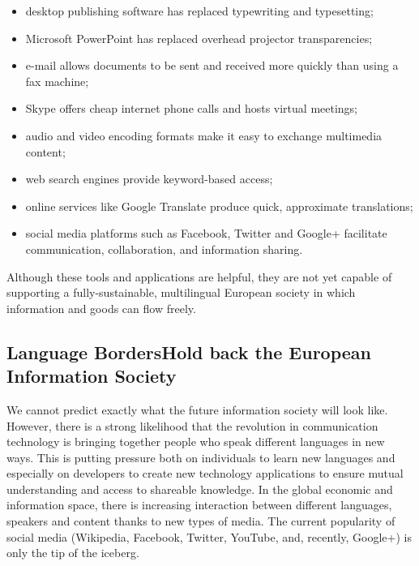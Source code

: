 \begin{multicols}{2}
\begin{itemize}
\item desktop publishing software has replaced typewriting and typesetting;
\item Microsoft PowerPoint has replaced overhead projector transparencies;
\item e-mail allows documents to be sent and received more quickly than using a fax machine;
\item Skype offers cheap internet phone calls and hosts virtual meetings;
\item audio and video encoding formats make it easy to exchange multimedia content;
\item web search engines provide keyword-based access;
\item online services like Google Translate produce quick, approximate translations;
\item social media platforms such as Facebook, Twitter and Google+ facilitate communication, collaboration, and information sharing.
\end{itemize}

Although these tools and applications are helpful, they are not yet capable of supporting a fully-sustainable, multilingual European society in which information and goods can flow freely.

\subsection[Language Borders Hold back the European Information Society]{Language Borders\newline Hold back the European Information Society}

We cannot predict exactly what the future information society will look like. However, there is a strong likelihood that the revolution in communication technology is bringing together people who speak different languages in new ways. This is putting pressure both on individuals to learn new languages and especially on developers to create new technology applications to ensure mutual understanding and access to shareable knowledge. In the global economic and information space, there is increasing interaction between different languages, speakers and content thanks to new types of media. The current popularity of social media (Wikipedia, Facebook, Twitter, YouTube, and, recently, Google+) is only the tip of the iceberg.



\end{multicols}

